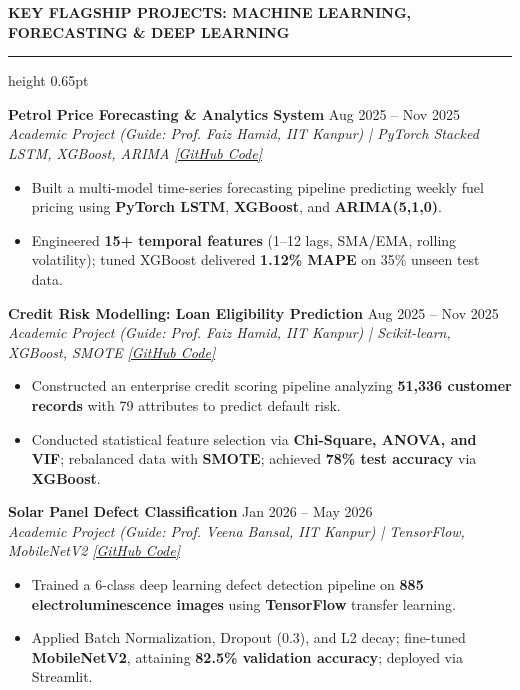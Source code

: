 \documentclass[10pt]{article}
\newcommand{\resumesection}[1]{%
  \vspace{2pt}%
  {\large \textbf{\uppercase{#1}}}%
  \vspace{1pt}%
  \hrule height 0.65pt%
  \vspace{1.5pt}%
}
\begin{document}
\resumesection{Key Flagship Projects: Machine Learning, Forecasting \& Deep Learning}

\textbf{Petrol Price Forecasting \& Analytics System} \hfill Aug 2025 -- Nov 2025\\
\textit{Academic Project (Guide: Prof. Faiz Hamid, IIT Kanpur) | PyTorch Stacked LSTM, XGBoost, ARIMA} \hfill \href{https://github.com/Ankitiitk369/Petrol-Price-Forecasting-Analytics-System}{\textit{[GitHub Code]}}
\begin{itemize}[noitemsep, topsep=1pt, partopsep=0pt, parsep=0pt]
    \item Built a multi-model time-series forecasting pipeline predicting weekly fuel pricing using \textbf{PyTorch LSTM}, \textbf{XGBoost}, and \textbf{ARIMA(5,1,0)}.
    \item Engineered \textbf{15+ temporal features} (1--12 lags, SMA/EMA, rolling volatility); tuned XGBoost delivered \textbf{1.12\% MAPE} on 35\% unseen test data.
\end{itemize}

\vspace{1.5pt}

\textbf{Credit Risk Modelling: Loan Eligibility Prediction} \hfill Aug 2025 -- Nov 2025\\
\textit{Academic Project (Guide: Prof. Faiz Hamid, IIT Kanpur) | Scikit-learn, XGBoost, SMOTE} \hfill \href{https://github.com/Ankitiitk369/Credit-Risk-Modelling-Loan-Eligibility-Prediction}{\textit{[GitHub Code]}}
\begin{itemize}[noitemsep, topsep=1pt, partopsep=0pt, parsep=0pt]
    \item Constructed an enterprise credit scoring pipeline analyzing \textbf{51,336 customer records} with 79 attributes to predict default risk.
    \item Conducted statistical feature selection via \textbf{Chi-Square, ANOVA, and VIF}; rebalanced data with \textbf{SMOTE}; achieved \textbf{78\% test accuracy} via \textbf{XGBoost}.
\end{itemize}

\vspace{1.5pt}

\textbf{Solar Panel Defect Classification} \hfill Jan 2026 -- May 2026\\
\textit{Academic Project (Guide: Prof. Veena Bansal, IIT Kanpur) | TensorFlow, MobileNetV2} \hfill \href{https://github.com/Ankitiitk369/Solar-panel-image-classification-Using-CNN-And-Pretrained-model}{\textit{[GitHub Code]}}
\begin{itemize}[noitemsep, topsep=1pt, partopsep=0pt, parsep=0pt]
    \item Trained a 6-class deep learning defect detection pipeline on \textbf{885 electroluminescence images} using \textbf{TensorFlow} transfer learning.
    \item Applied Batch Normalization, Dropout (0.3), and L2 decay; fine-tuned \textbf{MobileNetV2}, attaining \textbf{82.5\% validation accuracy}; deployed via Streamlit.
\end{itemize}
\end{document}
